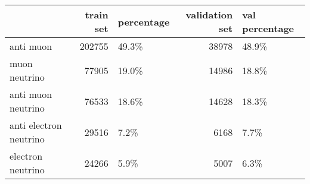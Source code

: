 \begin{tabular}{lrlrl}
\toprule
{} &  train set & percentage &  validation set & val percentage \\
\midrule
anti muon              &     202755 &      49.3\% &           38978 &          48.9\% \\
muon neutrino          &      77905 &      19.0\% &           14986 &          18.8\% \\
anti muon neutrino     &      76533 &      18.6\% &           14628 &          18.3\% \\
anti electron neutrino &      29516 &       7.2\% &            6168 &           7.7\% \\
electron neutrino      &      24266 &       5.9\% &            5007 &           6.3\% \\
\bottomrule
\end{tabular}
